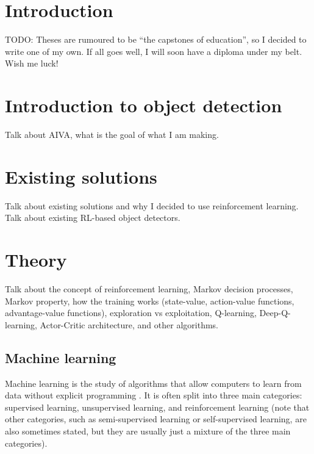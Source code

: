 \documentclass[
  digital,     %
  oneside,     %
  nosansbold,  %
  nocolorbold, %
  lof,         %
  lot,         %
]{fithesis4}
\begin{document}
\chapter*{Introduction}

TODO: Theses are rumoured to be \enquote{the capstones of education}, so
I decided to write one of my own. If all goes well, I will soon
have a diploma under my belt. Wish me luck!


\chapter{Introduction to object detection}
Talk about AIVA, what is the goal of what I am making.

\chapter{Existing solutions}
\label{chapt:existing_solutions}
Talk about existing solutions and why I decided to use reinforcement learning. Talk about existing RL-based object detectors.

\chapter{Theory}
Talk about the concept of reinforcement learning, Markov decision processes, Markov property, how the training works (state-value, action-value functions, advantage-value functions), exploration vs exploitation, Q-learning, Deep-Q-learning, Actor-Critic architecture, and other algorithms. 

\section{Machine learning}
Machine learning is the study of algorithms that allow computers to learn from data without explicit programming \cite[p. 5]{IB031}. It is often split into three main categories: supervised learning, unsupervised learning, and reinforcement learning (note that other categories, such as semi-supervised learning or self-supervised learning, are also sometimes stated, but they are usually just a mixture of the three main categories).
\end{document}
